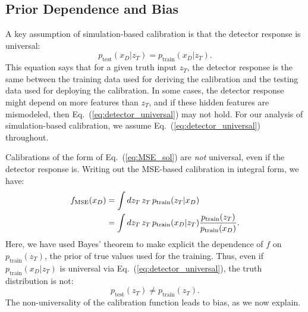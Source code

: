 \documentclass[aps,prd,reprint,preprintnumbers,superscriptaddress,nofootinbib,longbibliography,floatfix]{revtex4-1}
\DeclareRobustCommand{\Eq}[1]{Eq.~(\ref{eq:#1})}
\begin{document}
\subsection{Prior Dependence and Bias}

A key assumption of simulation-based calibration is that the detector response is universal:
%
\begin{equation}
    \label{eq:detector_universal}
    p_\text{test}(x_D|z_T)=p_\text{train}(x_D|z_T).
\end{equation}
%
This equation says that for a given truth input $z_T$, the detector response is the same between the training data used for deriving the calibration and the testing data used for deploying the calibration.
%
In some cases, the detector response might depend on more features than $z_T$, and if these hidden features are mismodeled, then \Eq{detector_universal} may not hold.
%
For our analysis of simulation-based calibration, we assume \Eq{detector_universal} throughout.


Calibrations of the form of \Eq{MSE_sol} are \textit{not} universal, even if the detector response is.
%
Writing out the MSE-based calibration in integral form, we have:
%
\begin{align}\nonumber
    f_{\rm MSE}(x_D) &= \int dz_T\,z_T\,p_{\text{train}}(z_T|x_D)\\
    &= \int dz_T\,z_T\,p_{\text{train}}(x_D|z_T)\frac{p_{\text{train}}(z_T)}{p_{\text{train}}(x_D)}. \label{eq:MSE_fit}
\end{align}
%
Here, we have used Bayes' theorem to make explicit the dependence of $f$ on $p_\text{train}(z_T)$, the prior of true values used for the training.
%
Thus, even if $p_{\text{train}}(x_D|z_T)$ is universal via \Eq{detector_universal}, the truth distribution is not:
%
\begin{equation}
    p_\text{test}(z_T) \not= p_\text{train}(z_T).
\end{equation}
%
The non-universality of the calibration function leads to bias, as we now explain.
\end{document}
